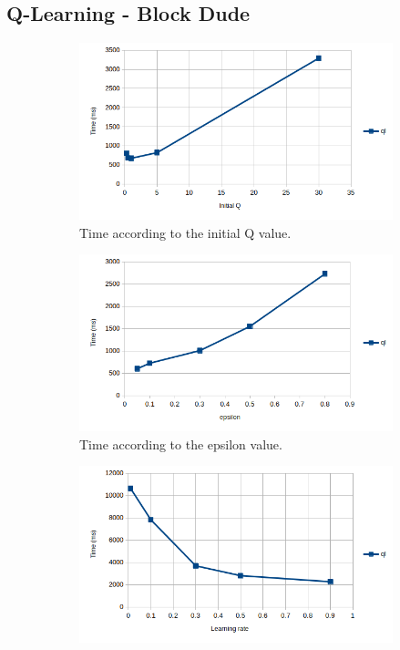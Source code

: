 \documentclass[10pt, twocolumn]{article}
\begin{document}
		\subsection{Q-Learning - Block Dude}

			\begin{figure}[]
				\centering
				\begin{subfigure}[t]{0.49\textwidth}
					\centering
					\includegraphics[width=\textwidth]{../graphics/BlockDude_time_q.png}
					\caption{Time according to the initial Q value.}
					\label{fig:BD:qinit}
				\end{subfigure}
				\begin{subfigure}[t]{0.49\textwidth}
					\centering
					\includegraphics[width=\textwidth]{../graphics/BlockDude_time_epsilon.png}
					\caption{Time according to the epsilon value.}
					\label{fig:BD:epsilon}
				\end{subfigure}
				\begin{subfigure}[t]{0.49\textwidth}
					\centering
					\includegraphics[width=\textwidth]{../graphics/BlockDude_time_rate.png}

\end{subfigure}
\end{figure}
\end{document}
